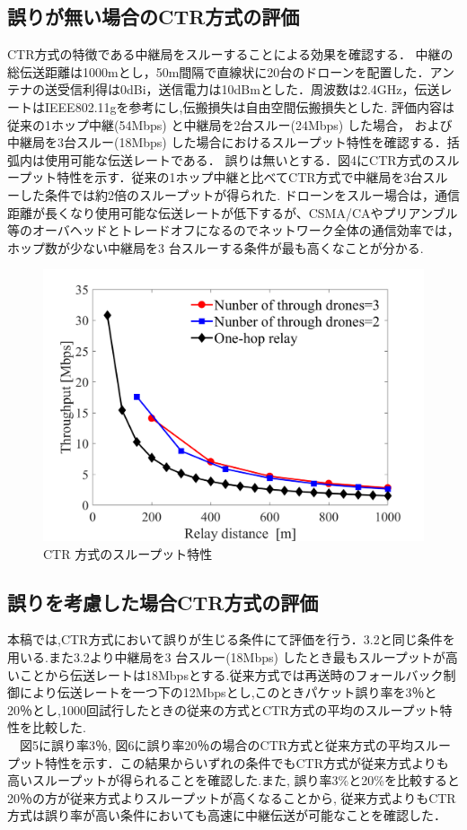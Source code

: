 \documentclass[a4paper,10pt]{ltjsarticle}
\begin{document}
\subsection{誤りが無い場合のCTR方式の評価}
CTR方式の特徴である中継局をスルーすることによる効果を確認する．%
中継の総伝送距離は1000mとし，50m間隔で直線状に20台のドローンを配置した．アンテナの送受信利得は0dBi，送信電力は10dBmとした．周波数は2.4GHz，伝送レートはIEEE802.11gを参考にし,伝搬損失は自由空間伝搬損失とした.
評価内容は従来の1ホップ中継(54Mbps) と中継局を2台スルー(24Mbps) した場合，
および中継局を3台スルー(18Mbps) した場合におけるスループット特性を確認する．括弧内は使用可能な伝送レートである．
誤りは無いとする．図4にCTR方式のスループット特性を示す．従来の1ホップ中継と比べてCTR方式で中継局を3台スルーした条件では約2倍のスループットが得られた.
ドローンをスルー場合は，通信距離が長くなり使用可能な伝送レートが低下するが、CSMA/CAやプリアンブル等のオーバヘッドとトレードオフになるのでネットワーク全体の通信効率では，
ホップ数が少ない中継局を3 台スルーする条件が最も高くなことが分かる.
\begin{figure}[H]
  \centering
  \includegraphics[width=\linewidth]{throughtput_vs_placement_50m_max_distance_3.png} %
  \caption{CTR 方式のスループット特性}
  \label{fig:throughput_through} %
\end{figure}
\subsection{誤りを考慮した場合CTR方式の評価}
本稿では,CTR方式において誤りが生じる条件にて評価を行う．3.2と同じ条件を用いる.また3.2より中継局を3 台スルー(18Mbps) したとき最もスループットが高いことから伝送レートは18Mbpsとする.従来方式では再送時のフォールバック制御により伝送レートを一つ下の12Mbpsとし,このときパケット誤り率を3％と20％とし,1000回試行したときの従来の方式とCTR方式の平均のスループット特性を比較した.
\\　図5に誤り率3％, 図6に誤り率20％の場合のCTR方式と従来方式の平均スループット特性を示す．この結果からいずれの条件でもCTR方式が従来方式よりも高いスループットが得られることを確認した.また, 誤り率3\%と20\%を比較すると20％の方が従来方式よりスループットが高くなることから, 従来方式よりもCTR方式は誤り率が高い条件においても高速に中継伝送が可能なことを確認した．
\end{document}

